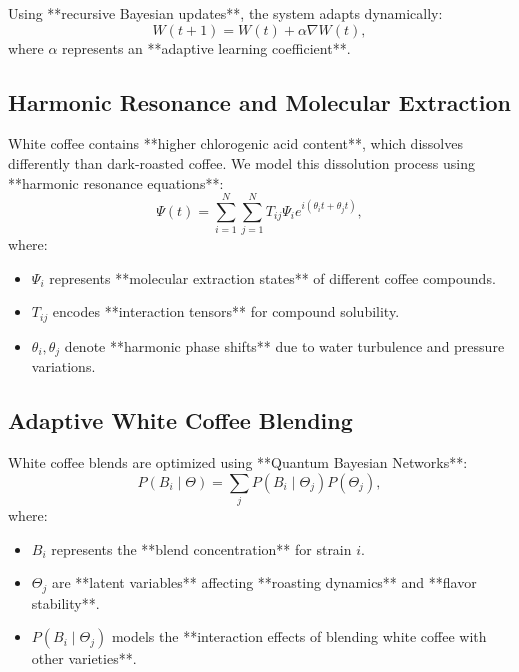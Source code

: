 \documentclass{article}
\theoremstyle{plain}
\theoremstyle{claimstyle}
\begin{document}
Using **recursive Bayesian updates**, the system adapts dynamically:
\begin{equation}
W(t+1) = W(t) + \alpha \nabla W(t),
\end{equation}
where \( \alpha \) represents an **adaptive learning coefficient**.

\subsection{Harmonic Resonance and Molecular Extraction}
White coffee contains **higher chlorogenic acid content**, which dissolves differently than dark-roasted coffee. We model this dissolution process using **harmonic resonance equations**:
\begin{equation}
\Psi(t) = \sum_{i=1}^{N} \sum_{j=1}^{N} T_{ij} \Psi_i e^{i(\theta_i t + \theta_j t)},
\end{equation}
where:
\begin{itemize}
    \item \( \Psi_i \) represents **molecular extraction states** of different coffee compounds.
    \item \( T_{ij} \) encodes **interaction tensors** for compound solubility.
    \item \( \theta_i, \theta_j \) denote **harmonic phase shifts** due to water turbulence and pressure variations.
\end{itemize}

\subsection{Adaptive White Coffee Blending}
White coffee blends are optimized using **Quantum Bayesian Networks**:
\begin{equation}
P(B_i \mid \Theta) = \sum_{j} P(B_i \mid \Theta_j) P(\Theta_j),
\end{equation}
where:
\begin{itemize}
    \item \( B_i \) represents the **blend concentration** for strain \( i \).
    \item \( \Theta_j \) are **latent variables** affecting **roasting dynamics** and **flavor stability**.
    \item \( P(B_i \mid \Theta_j) \) models the **interaction effects of blending white coffee with other varieties**.
\end{itemize}
\end{document}
